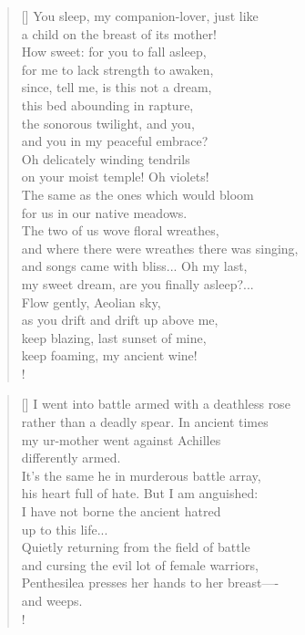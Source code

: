 \documentclass[]{article}
\begin{document}
\settowidth{\versewidth}{You sleep, my companion-lover, just like    }
\begin{verse}[\versewidth]
You sleep, my companion-lover, just like\\
a child on the breast of its mother!\\
How sweet: for you to fall asleep,\\
for me to lack strength to awaken,\\
since, tell me, is this not a dream,\\
this bed abounding in rapture,\\
the sonorous twilight, and you,\\
and you in my peaceful embrace?\\
Oh delicately winding tendrils\\
on your moist temple! Oh violets!\\
The same as the ones which would bloom\\
for us in our native meadows.\\
The two of us wove floral wreathes,\\
and where there were wreathes there was singing,\\
and songs came with bliss... Oh my last,\\
my sweet dream, are you finally asleep?...\\
Flow gently, Aeolian sky,\\
as you drift and drift up above me,\\
keep blazing, last sunset of mine,\\
keep foaming, my ancient wine!\\!
\end{verse}
\newpage

\vspace*{0.05\textheight}
\settowidth{\versewidth}{I went into battle armed with a deathless rose}
\begin{verse}[\versewidth]
I went into battle armed with a deathless rose\\
rather than a deadly spear. In ancient times\\
my ur-mother went against Achilles\\
differently armed.\\
It's the same he in murderous battle array,\\
his heart full of hate. But I am anguished:\\
I have not borne the ancient hatred\\
up to this life...\\
Quietly returning from the field of battle\\
and cursing the evil lot of female warriors,\\ 
Penthesilea presses her hands to her breast—- \\
and weeps.\\!
\end{verse}
\bigskip \bigskip
\end{document}
